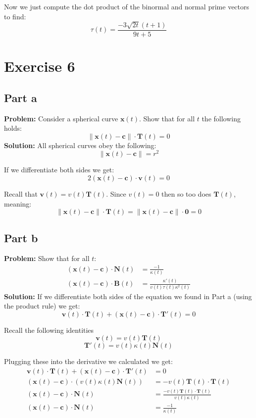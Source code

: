 \documentclass{article}
\begin{document}
Now we just compute the dot product of the binormal and normal prime vectors to find:
$$\tau(t)=\frac{-3\sqrt{2t}(t+1)}{9t+5}$$

\section*{Exercise 6}
\subsection*{Part a}
\textbf{Problem:} Consider a spherical curve $\mathbf x(t)$. Show that for all $t$ the following holds:
$$\|\mathbf x(t)-\mathbf c\|\cdot\mathbf T(t)=0$$
\textbf{Solution:} All spherical curves obey the following:
$$\|\mathbf x(t)-\mathbf c\|=r^2$$

If we differentiate both sides we get:
$$2(\mathbf x(t)-\mathbf c)\cdot\mathbf v(t)=0$$

Recall that $\mathbf v(t)=v(t)\mathbf T(t)$. Since $v(t)=0$ then so too does $\mathbf T(t)$, meaning:
$$\|\mathbf x(t)-\mathbf c\|\cdot\mathbf T(t)=\|\mathbf x(t)-\mathbf c\|\cdot\mathbf 0=0$$

\subsection*{Part b}
\textbf{Problem:} Show that for all $t$:
\begin{align*}
(\mathbf x(t)-\mathbf c)\cdot\mathbf N(t)&=\frac{-1}{\kappa(t)}\\
(\mathbf x(t)-\mathbf c)\cdot\mathbf B(t)&=\frac{\kappa'(t)}{v(t)\tau(t)\kappa^2(t)}
\end{align*}
\textbf{Solution:} If we differentiate both sides of the equation we found in Part a (using the product rule) we get:
$$\mathbf v(t)\cdot\mathbf T(t)+(\mathbf x(t)-\mathbf c)\cdot\mathbf T'(t)=0$$

Recall the following identities
$$\mathbf v(t)=v(t)\mathbf T(t)$$
$$\mathbf T'(t)=v(t)\kappa(t)\mathbf N(t)$$

Plugging these into the derivative we calculated we get:
\begin{align*}
  \mathbf v(t)\cdot\mathbf T(t)+(\mathbf x(t)-\mathbf c)\cdot\mathbf T'(t)&=0\\
  (\mathbf x(t)-\mathbf c)\cdot(v(t)\kappa(t)\mathbf N(t))&=-v(t)\mathbf T(t)\cdot\mathbf T(t)\\
  (\mathbf x(t)-\mathbf c)\cdot\mathbf N(t)&=\frac{-v(t)\mathbf T(t)\cdot\mathbf T(t)}{v(t)\kappa(t)}\\
  (\mathbf x(t)-\mathbf c)\cdot\mathbf N(t)&=\frac{-1}{\kappa(t)}\\
\end{align*}
\end{document}
